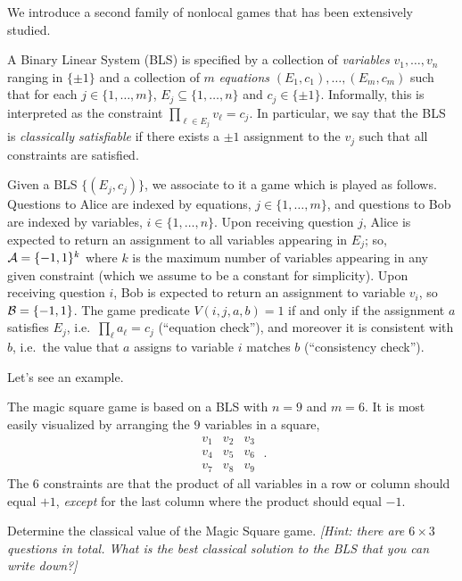 We introduce a second family of nonlocal games that has been extensively studied. 

A Binary Linear System (BLS) is specified by a collection of \emph{variables} $v_1,\ldots,v_n$ ranging in $\{\pm 1\}$ and a collection of $m$ \emph{equations} $(E_1,c_1),\ldots,(E_m,c_m)$ such that for each $j\in\{1,\ldots,m\}$, $E_j \subseteq \{1,\ldots,n\}$ and $c_j\in\{\pm 1\}$. Informally, this is interpreted as the constraint $\prod_{\ell\in E_j} v_\ell = c_j$. In particular, we say that the BLS is \emph{classically satisfiable} if there exists a $\pm1$ assignment to the $v_j$ such that all constraints are satisfied. 

Given a BLS $\{(E_j,c_j)\}$, we associate to it a game which is played as follows. Questions to Alice are indexed by equations, $j\in \{1,\ldots,m\}$, and questions to Bob are indexed by variables, $i\in \{1,\ldots,n\}$. 
Upon receiving question $j$, Alice is expected to return an assignment to all variables appearing in $E_j$; so, $\mathcal{A}=\{-1,1\}^k$ where $k$ is the maximum number of variables appearing in any given constraint (which we  assume to be a constant for simplicity). Upon receiving question $i$, Bob  is expected to return an assignment to variable $v_i$, so $\mathcal{B}=\{-1,1\}$.  The game predicate $V(i,j,a,b)=1$ if and only if the assignment $a$ satisfies $E_j$, i.e.\ $\prod_\ell a_\ell = c_j$ (``equation check''), and moreover it is consistent with $b$, i.e.\ the value that $a$ assigns to variable $i$ matches $b$ (``consistency check''). 


Let's see an example. 

\begin{example}
The magic square game is based on a BLS with $n=9$ and $m=6$. It is most easily visualized by arranging the $9$ variables in a square, 
\[\begin{matrix} v_1 & v_2 & v_3 \\ v_4 & v_5 & v_6 \\ v_7 & v_8 & v_9 \end{matrix}\;.\]
The $6$ constraints are that the product of all variables in a row or column should equal $+1$, \emph{except} for the last column where the product should equal $-1$.
\end{example}

\begin{exercise}\label{ex:ms-cval}
Determine the classical value of the Magic Square game. \emph{[Hint: there are $6\times 3$ questions in total. What is the best classical solution  to the BLS that you can write down?]}
\end{exercise}

